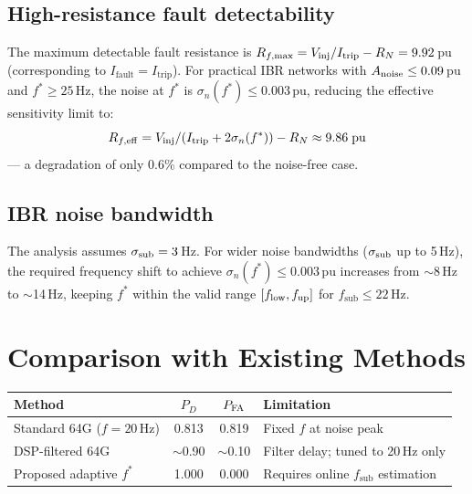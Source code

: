 \documentclass[11pt,a4paper]{article}
\newcommand{\Ifault}{I_{\mathrm{fault}}}
\newcommand{\Itrip}{I_{\mathrm{trip}}}
\newcommand{\sigman}{\sigma_n}
\newcommand{\fopt}{f^*}
\newcommand{\fsub}{f_{\mathrm{sub}}}
\newcommand{\RN}{R_N}
\begin{document}
\subsection{High-resistance fault detectability}

The maximum detectable fault resistance is
$R_{f,\rm max} = V_{\rm inj}/\Itrip - \RN = 9.92$\,pu (corresponding to
$\Ifault = \Itrip$).  For practical IBR networks with $A_{\rm noise} \leq 0.09$\,pu
and $\fopt \geq 25$\,Hz, the noise at $\fopt$ is $\sigman(\fopt) \leq 0.003$\,pu,
reducing the effective sensitivity limit to:
\[
  R_{f,\rm eff} = V_{\rm inj}/(\Itrip + 2\sigman(\fopt)) - \RN \approx 9.86\;\text{pu}
\]
--- a degradation of only 0.6\% compared to the noise-free case.

\subsection{IBR noise bandwidth}

The analysis assumes $\sigma_{\rm sub} = 3$\,Hz.  For wider noise bandwidths
($\sigma_{\rm sub}$ up to 5\,Hz), the required frequency shift to achieve
$\sigman(\fopt) \leq 0.003$\,pu increases from $\sim$8\,Hz to $\sim$14\,Hz,
keeping $\fopt$ within the valid range $[f_{\rm low}, f_{\rm up}]$ for
$\fsub \leq 22$\,Hz.

\section{Comparison with Existing Methods}
\label{sec:comparison}

\begin{center}
\begin{tabular}{p{}ccp{}}
  \toprule
  Method & $P_D$ & $P_{\rm FA}$ & Limitation \\
  \midrule
  Standard 64G ($f=20$\,Hz) \cite{IEEE_C37_101}
    & 0.813 & 0.819 & Fixed $f$ at noise peak \\
  DSP-filtered 64G \cite{Finney1988}
    & $\sim$0.90 & $\sim$0.10 & Filter delay; tuned to 20\,Hz only \\
  Proposed adaptive $\fopt$
    & 1.000 & 0.000 & Requires online $\fsub$ estimation \\
  \bottomrule
\end{tabular}
\end{center}
\end{document}
